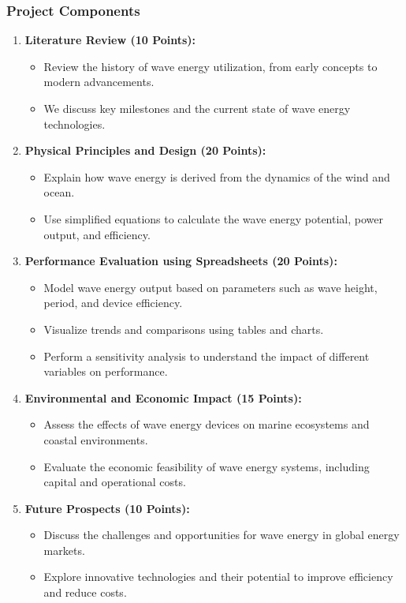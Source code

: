 \documentclass[11pt]{article}
\begin{document}
\subsubsection*{Project Components}
\begin{enumerate}
    \item \textbf{Literature Review (10 Points):}
    \begin{itemize}
        \item Review the history of wave energy utilization, from early concepts to modern advancements.
        \item We discuss key milestones and the current state of wave energy technologies.
    \end{itemize}

    \item \textbf{Physical Principles and Design (20 Points):}
    \begin{itemize}
        \item Explain how wave energy is derived from the dynamics of the wind and ocean.
        \item Use simplified equations to calculate the wave energy potential, power output, and efficiency.
    \end{itemize}

    \item \textbf{Performance Evaluation using Spreadsheets (20 Points):}
    \begin{itemize}
        \item Model wave energy output based on parameters such as wave height, period, and device efficiency.
        \item Visualize trends and comparisons using tables and charts.
        \item Perform a sensitivity analysis to understand the impact of different variables on performance.
    \end{itemize}

    \item \textbf{Environmental and Economic Impact (15 Points):}
    \begin{itemize}
        \item Assess the effects of wave energy devices on marine ecosystems and coastal environments.
        \item Evaluate the economic feasibility of wave energy systems, including capital and operational costs.
    \end{itemize}

    \item \textbf{Future Prospects (10 Points):}
    \begin{itemize}
        \item Discuss the challenges and opportunities for wave energy in global energy markets.
        \item Explore innovative technologies and their potential to improve efficiency and reduce costs.
    \end{itemize}


\end{enumerate}
\end{document}
